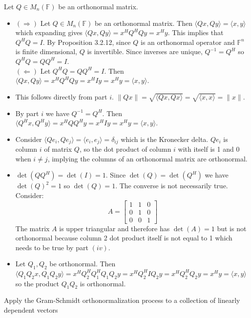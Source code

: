 \documentclass[12pt]{article}
\newenvironment{problem}[2][Problem]{\begin{trivlist}
\item[\hskip \labelsep {\bfseries #1}\hskip \labelsep {\bfseries #2}]}{\end{trivlist}}
\begin{document}
\begin{problem}{10.} Let $Q \in M_n(\mathbb{F})$ be an orthonormal matrix. 
\begin{itemize}
\item [(i)] $(\Rightarrow)$ Let $Q \in M_n(\mathbb{F})$ be an orthonormal matrix. Then $\langle Qx, Qy \rangle  = \langle x,y \rangle$ which expanding gives $\langle Qx, Qy \rangle = x^HQ^HQy = x^Hy$. This implies that $Q^HQ = I$. By Proposition 3.2.12, since $Q$ is an orthonormal operator and $\mathbb{F}^n$ is finite dimensional, $Q$ is invertible. Since inverses are unique,  $Q^{-1}  = Q^H$ so $Q^HQ = QQ^H = I$. \\
$(\Leftarrow)$ Let $Q^HQ = QQ^H = I$. Then $\langle Qx, Qy \rangle = x^HQ^HQy = x^HIy = x^Hy = \langle x,y \rangle$.

\item [(ii)] This follows directly from part $i$. $\|Qx\| = \sqrt{\langle Qx, Qx \rangle} = \sqrt{\langle x, x \rangle} = \|x\|$. 
\item [(iii)] By part $i$ we have $Q^{-1}  = Q^H$. Then $\langle Q^Hx, Q^Hy \rangle = x^HQQ^Hy = x^HIy = x^Hy = \langle x,y \rangle$.
\item [(iv)] Consider $\langle Qe_i, Qe_j \rangle = \langle e_i,e_j \rangle = \delta_{ij}$ which is the Kronecker delta. $Qe_i$ is column $i$ of matrix $Q$, so the dot product of column $i$ with itself is 1 and 0 when $i \neq j$, implying the columns of an orthonormal matrix are orthonormal.  
\item [(v)] $\det(QQ^H) = \det(I) = 1$. Since $\det(Q) = \det(Q^H)$ we have $\det(Q)^2= 1$ so $\det(Q)= 1$. The converse is not necessarily true. Consider: 
\[ A= 
\begin{bmatrix}
    1   & 1 & 0 \\
    0   & 1& 0 \\
    0   & 0 &1 
\end{bmatrix}
\]
The matrix $A$ is upper triangular and therefore has $\det(A) = 1$ but is not orthonormal because column 2 dot product itself is not equal to 1 which needs to be true by part $(iv)$. 
\item [(vi)] Let $Q_1, Q_2$ be orthonormal. Then $\langle Q_1Q_2x, Q_1Q_2y \rangle = x^HQ_2^HQ_1^HQ_1Q_2y = x^HQ_2^HIQ_2y = x^HQ_2^HQ_2y = x^Hy = \langle x ,y \rangle$ so the product $Q_1Q_2$ is orthonormal. 
\end{itemize}
\end{problem}

\begin{problem}{11.} Apply the Gram-Schmidt orthonormalization process to a collection of linearly dependent vectors 
\end{problem}
\end{document}
